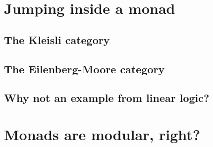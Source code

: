 \documentclass{article}
\begin{document}
\section{Jumping inside a monad}
\label{sec:jumping_inside_a_monad}
\subsection{The Kleisli category}
\label{subsec:the_kleisli_category}


\subsection{The Eilenberg-Moore category}
\label{subsec:the_eilenberg-moore_category}


\subsection{Why not an example from linear logic?}
\label{subsec:why_not_an_example_from_linear_logic}


\section{Monads are modular, right?}
\label{sec:monads_are_modular,_right?}





\end{document}
